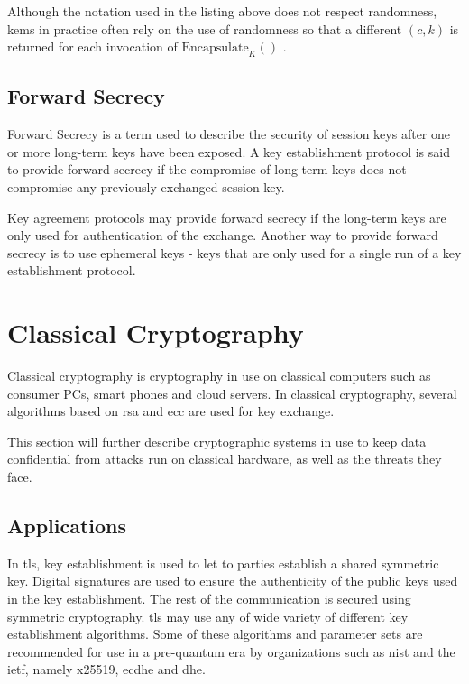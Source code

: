 Although the notation used in the listing above does not respect randomness, \glspl{kem} in practice often rely on the use of randomness so that a different $(c,k)$ is returned for each invocation of $\text{Encapsulate}_K()$ \cite{boyd2020}. 

\subsection{Forward Secrecy}

Forward Secrecy is a term used to describe the security of session keys after one or more long-term keys have been exposed. A key establishment protocol is said to provide forward secrecy if the compromise of long-term keys does not compromise any previously exchanged session key\cite{boyd2020}.

Key agreement protocols may provide forward secrecy if the long-term keys are only used for authentication of the exchange. Another way to provide forward secrecy is to use ephemeral keys - keys that are only used for a single run of a key establishment protocol\cite{boyd2020}.

\section{Classical Cryptography}
\label{section:background:classical-cryptography}

Classical cryptography is cryptography in use on classical computers such as consumer PCs, smart phones and cloud servers. In classical cryptography, several algorithms based on \gls{rsa} and \gls{ecc} are used for key exchange.

This section will further describe cryptographic systems in use to keep data confidential from attacks run on classical hardware, as well as the threats they face.

\subsection{Applications}
\label{section:background:classical-cryptography:applications}


In \gls{tls}, key establishment is used to let to parties establish a shared symmetric key. Digital signatures are used to ensure the authenticity of the public keys used in the key establishment. The rest of the communication is secured using symmetric cryptography\cite{bernstein2017}. \gls{tls} may use any of wide variety of different key establishment algorithms. Some of these algorithms and parameter sets are recommended for use in a pre-quantum era by organizations such as \gls{nist} and the \gls{ietf}, namely \gls{x25519}\cite{rfc7748}, \gls{ecdhe}\cite{nist2019} and \gls{dhe}\cite{nist2019}.

